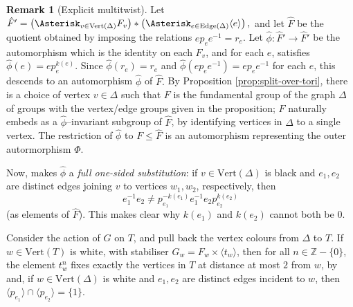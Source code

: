 \documentclass[11pt,oneside]{amsart}
\theoremstyle{definition}
\newtheorem{rem}[thm]{Remark}
\newcommand{\field}[1]{\mathbb{#1}}
\newcommand{\integers}{\ensuremath{\field{Z}}}
\newcommand{\vertices}{\mathrm{Vert}}
\newcommand{\edges}{\mathrm{Edge}}
\begin{document}
\begin{rem}[Explicit multitwist]\label{rem:multi-twist}
Let $\hat F'=\left(\Asterisk_{v\in\vertices(\Delta)} F_v\right)*\left(\Asterisk_{e\in\edges(\Delta)}\langle e\rangle\right),$
and let $\hat F$ be the quotient obtained by imposing the relations $ep_ee^{-1}=r_e$.  Let $\hat\phi:\hat F'\to\hat F'$ be the automorphism which is the identity on each $F_v$, and for each $e$, satisfies $\hat\phi(e)=ep_e^{k(e)}$.  Since $\hat \phi(r_e)=r_e$ and $\hat\phi(ep_ee^{-1})=ep_ee^{-1}$ for each $e$, this descends to an automorphism $\hat\phi$ of $\hat F.$  By Proposition \ref{prop:split-over-tori}, there is a choice of vertex $v\in \Delta$ such that $F$ is the fundamental group of the graph $\Delta$ of groups with the vertex/edge groups given in the proposition; $F$ naturally embeds as a $\hat\phi$--invariant subgroup of $\hat F$, by identifying vertices in $\Delta$ to a single vertex.  The restriction of $\hat\phi$ to $F\leq \hat F$ is an automorphism representing the outer autormorphism $\Phi$.  

Now, \cite[Thm. 2.7]{DahmaniTouikan} makes $\hat\phi$ a \emph{full one-sided substitution}: if $v\in \vertices(\Delta)$ is black and $e_1,e_2$ are distinct edges joining $v$ to   vertices $w_1,w_2$, respectively, then  $$e_1^{-1}e_2\neq p_{e_1}^{-k(e_1)}e_1^{-1}e_2p_{e_2}^{k(e_2)}$$
(as elements of $\hat F$).  This makes clear why $k(e_1)$ and $k(e_2)$ cannot both be $0$.

Consider the action of $G$ on $T$, and pull back the vertex colours from $\Delta$ to $T$.  If $w\in \vertices(T)$ is white, with stabiliser $G_w=F_w\times \langle t_w\rangle$, then for all $n\in\integers-\{0\}$, the element $t_w^n$ fixes exactly the vertices in $T$ at distance at most $2$ from $w$, by \cite[Prop. 3.4]{DahmaniTouikan} and, if $w\in\vertices(\Delta)$ is white and $e_1,e_2$ are distinct edges incident to $w$, then $\langle p_{e_1}\rangle \cap\langle p_{e_2}\rangle=\{1\}$.
\end{rem}
\end{document}
